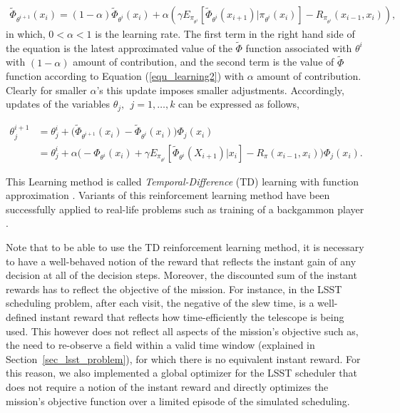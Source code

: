 \documentclass[12pt]{aastex62}
\theoremstyle{definition}
\begin{document}
\begin{equation}\label{equ_updatePHI}
\begin{aligned}
\tilde \Phi_{\theta^{i+1}}(x_{{i}}) = (1-\alpha) \tilde \Phi_{\theta^{i}}(x_{{i}})+ \alpha  ( \gamma  E_{\pi_{\theta^i}}[\tilde \Phi_{\theta^{i}}(x_{{i+1}})|\pi_{\theta^{i}}(x_{{i}})] -R_{\pi_{\theta^i}}(x_{i-1},x_i) ),
\end{aligned}
\end{equation}
in which, $0<\alpha<1$ is the learning rate. The first term in the right hand side of the equation is the latest approximated value of the $\tilde \Phi$ function associated with $\theta^i$ with $(1-\alpha)$ amount of contribution, and the second term is the value of $\tilde \Phi$ function according to Equation (\ref{equ_learning2}) with $\alpha$ amount of contribution. Clearly for smaller $\alpha$'s this update imposes smaller adjustments. Accordingly, updates of the variables $\theta_j,~~j=1,\dots, k$ can be expressed as follows,

\begin{equation} \label{equ_TD_update}
\begin{aligned}
\theta_j^{i+1} &= \theta_j^{i} + \Big( \tilde \Phi_{\theta^{i+1}}(x_{{i}})  - \tilde \Phi_{\theta^{i}}(x_{{i}}) \Big)\Phi_j(x_{i})\\
& = \theta_j^{i} + \alpha \Big(-\Phi_{\theta^{i}}(x_{{i}}) + \gamma  E_{\pi_{\theta^i}}[\tilde \Phi_{\theta^{i}}(X_{{i+1}})|x_{{i}}] -R_{\pi}(x_{i-1},x_i)  \Big)\Phi_j(x_{i}).
\end{aligned}
\end{equation}

This Learning method is called \textit{Temporal-Difference} (TD) learning with function approximation \citep{tsitsiklis1997analysis}. Variants of this reinforcement learning method have been successfully applied to real-life problems such as training of a backgammon player \citep{tesauro1995temporal}.


Note that to be able to use the TD reinforcement learning method, it is necessary to have a well-behaved notion of the reward that reflects the instant gain of any decision at all of the decision steps. Moreover, the discounted sum of the instant rewards has to reflect the objective of the mission. For instance, in the LSST scheduling problem, after each visit, the negative of the slew time, is a well-defined instant reward that reflects how time-efficiently the telescope is being used. This however does not reflect all aspects of the mission's objective such as, the need to re-observe a field within a valid time window (explained in Section~\ref{sec_lsst_problem}), for which there is no equivalent instant reward. For this reason, we also implemented a global optimizer for the LSST scheduler that does not require a notion of the instant reward and directly optimizes the mission's objective function over a limited  episode of the simulated scheduling. 
\end{document}

